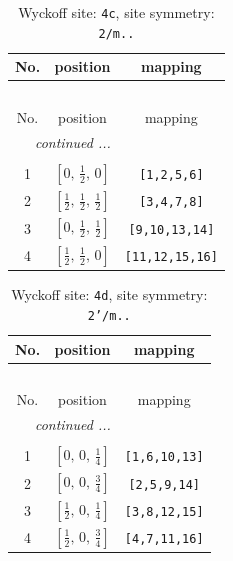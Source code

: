 \documentclass[fleqn,8pt]{jsarticle}
\begin{document}
\renewcommand{\arraystretch}{1.2}
\begin{longtable}{ccc}
\caption{Wyckoff site: {\tt 4c}, site symmetry: {\tt 2/m..}}
 \\
 \hline \hline
No. & position & mapping \\ \hline \endfirsthead

\multicolumn{2}{l}{\tablename\ \thetable{}} \\
 \hline \hline
No. & position & mapping \\ \hline \endhead

 \hline \hline
\multicolumn{2}{r}{\footnotesize\it continued ...} \\ \endfoot

 \hline \hline
\multicolumn{2}{r}{} \\ \endlastfoot

1 & $\left[ 0,\, \frac{1}{2},\, 0 \right]$ & {\tt [1,2,5,6]} \\ \hline
2 & $\left[ \frac{1}{2},\, \frac{1}{2},\, \frac{1}{2} \right]$ & {\tt [3,4,7,8]} \\ \hline
3 & $\left[ 0,\, \frac{1}{2},\, \frac{1}{2} \right]$ & {\tt [9,10,13,14]} \\ \hline
4 & $\left[ \frac{1}{2},\, \frac{1}{2},\, 0 \right]$ & {\tt [11,12,15,16]} \\
\end{longtable}
\renewcommand{\arraystretch}{1.2}
\begin{longtable}{ccc}
\caption{Wyckoff site: {\tt 4d}, site symmetry: {\tt 2'/m..}}
 \\
 \hline \hline
No. & position & mapping \\ \hline \endfirsthead

\multicolumn{2}{l}{\tablename\ \thetable{}} \\
 \hline \hline
No. & position & mapping \\ \hline \endhead

 \hline \hline
\multicolumn{2}{r}{\footnotesize\it continued ...} \\ \endfoot

 \hline \hline
\multicolumn{2}{r}{} \\ \endlastfoot

1 & $\left[ 0,\, 0,\, \frac{1}{4} \right]$ & {\tt [1,6,10,13]} \\ \hline
2 & $\left[ 0,\, 0,\, \frac{3}{4} \right]$ & {\tt [2,5,9,14]} \\ \hline
3 & $\left[ \frac{1}{2},\, 0,\, \frac{1}{4} \right]$ & {\tt [3,8,12,15]} \\ \hline
4 & $\left[ \frac{1}{2},\, 0,\, \frac{3}{4} \right]$ & {\tt [4,7,11,16]} \\
\end{longtable}
\end{document}
